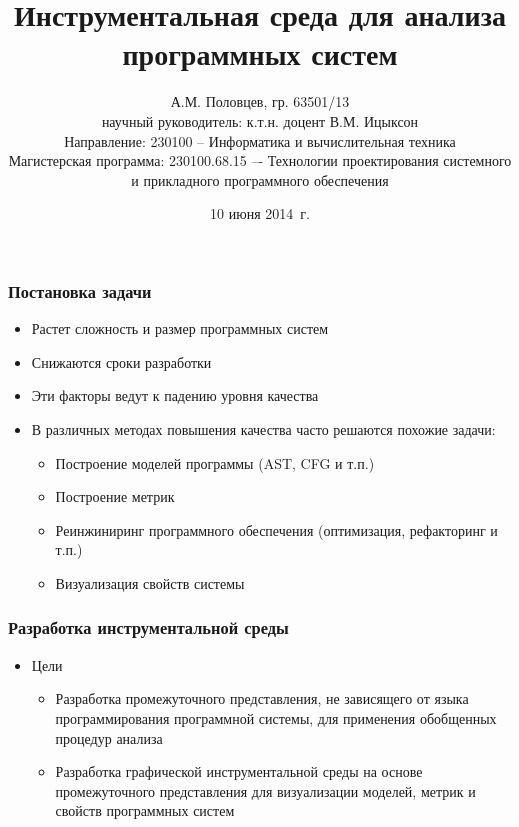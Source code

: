 \documentclass{beamer}
\title[Инструментальная среда]{Инструментальная среда для анализа программных систем}
\author[А.М. Половцев]{
    А.М. Половцев, гр. 63501/13\\
    научный руководитель: к.т.н. доцент В.М. Ицыксон\\[3ex]
    Направление: 230100 -- Информатика и вычислительная техника\\
    Магистерская программа: 230100.68.15 –- Технологии проектирования
системного и прикладного программного обеспечения
}
\institute[СПбГПУ]{Санкт-Петербургский государственный политехнический университет}
\date[10 июня 2014~г.]{10 июня 2014~г.}
\begin{document}
\frame{\titlepage}
\begin{frame}
\frametitle{Постановка задачи}

\begin{itemize}
    \item Растет сложность и размер программных систем
    \item Снижаются сроки разработки
    \item Эти факторы ведут к падению уровня качества
    \item В различных методах повышения качества часто решаются похожие задачи:
    \begin{itemize}
        \item Построение моделей программы (AST, CFG и т.п.)
        \item Построение метрик
        \item Реинжиниринг программного обеспечения (оптимизация, рефакторинг и т.п.)
        \item Визуализация свойств системы
    \end{itemize}
\end{itemize}
\pause
\begin{alertblock}{}
\end{alertblock}

\end{frame}
\begin{frame}
\frametitle{Разработка инструментальной среды}

\begin{itemize}
    \item Цели
        \begin{itemize}
            \item Разработка промежуточного представления, не зависящего от
            языка программирования программной системы, для применения
            обобщенных процедур анализа
            \item Разработка графической инструментальной среды на основе
            промежуточного представления для визуализации моделей, метрик и
            свойств программных систем
        \end{itemize}

\end{itemize}

\end{frame}
\end{document}
